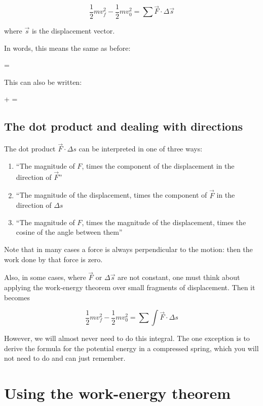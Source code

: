 \documentclass[10pt]{article}
\begin{document}
\begin{equation}
\frac{1}{2}mv_f^2 - \frac{1}{2}mv_0^2 = \sum \vec F \cdot \Delta \vec s
\end{equation}

where $\vec s$ is the displacement vector.

In words, this means the same as before:

 = 

This can also be written:

 +  = 

\subsection{The dot product and dealing with directions}

The dot product $\vec F \cdot \Delta s$ can be interpreted in one of three ways:

\begin{enumerate}
	\item ``The magnitude of $F$, times the component of the displacement in the direction of $\vec F$''
	\item ``The magnitude of the displacement, times the component of $\vec F$ in the direction of $\Delta s$
	\item ``The magnitude of $F$, times the magnitude of the displacement, times the cosine of the angle between them''
\end{enumerate}

Note that in many cases a force is always perpendicular to the motion: then the work done by that force is zero.

Also, in some cases, where $\vec F$ or $\Delta \vec s$ are not constant, one must think about applying the work-energy theorem over small fragments of displacement. Then it becomes

\begin{equation}
\frac{1}{2}mv_f^2 - \frac{1}{2}mv_0^2 = \sum \int \vec F \cdot \Delta s
\end{equation}

However, we will almost never need to do this integral. The one exception is to derive the formula for the potential energy in a compressed spring, which you will not need to do and can just remember.



\section{Using the work-energy theorem}
\end{document}
